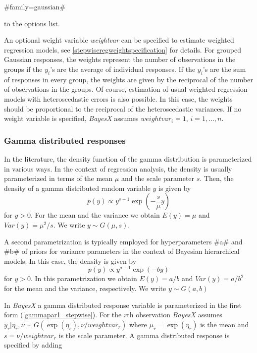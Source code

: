 #family=gaussian#

to the options list.

An optional weight variable {\em weightvar} can be specified to
estimate weighted regression models, see
\autoref{stepwiseregweightspecification} for details. For grouped Gaussian
responses, the weights represent the number of observations in the
groups if the $y_i$'s are the average of individual responses. If
the $y_i$'s are the sum of responses in every group, the weights are
given by the reciprocal of the number of observations in the groups.
Of course, estimation of usual weighted regression models with
heteroscedastic errors is also possible. In this case, the weights
should be proportional to the reciprocal of the heteroscedastic
variances. If no weight variable is specified, {\em BayesX} assumes
$weightvar_i = 1$, $i=1,\dots,n$.

\subsubsection*{Gamma distributed responses}

In the literature, the density function of the gamma distribution
is parameterized in various ways. In the context of regression
analysis, the density is usually parameterized in terms of the
mean $\mu$ and the scale parameter $s$. Then, the density of a
gamma distributed random variable $y$ is given by
\begin{equation}
\label{gammapar1_stepwise} p(y) \propto y^{s-1}\exp \left(
-\frac{s}{\mu} y \right)
\end{equation}
for $y > 0$. For the mean and the variance we obtain $E(y) = \mu$
and $Var(y) = \mu^2/s$. We write $y \sim G(\mu,s)$.

A second parametrization is typically employed for
hyperparameters #a# and #b# of priors for variance parameters in
the context of Bayesian hierarchical models. In this case, the
density is given by
\begin{equation}
\label{gammapar2_stepwise} p(y) \propto y^{a-1}\exp(-b y)
\end{equation}
for $y>0$. In this parametrization we obtain $E(y) = a/b$ and
$Var(y) = a/b^2$ for the mean and the variance, respectively. We
write $y \sim G(a,b)$

In {\em BayesX} a gamma distributed response variable is
parameterized in the first form (\autoref{gammapar1_stepwise}). For the
$r$th observation {\em BayesX} assumes  $y_r | \eta_r,\nu \sim
G(\exp(\eta_r),\nu/weightvar_r)$ where $\mu_r = \exp(\eta_r)$ is the
mean and $s=\nu/weightvar_r$ is the scale parameter. A gamma
distributed response is specified by adding

